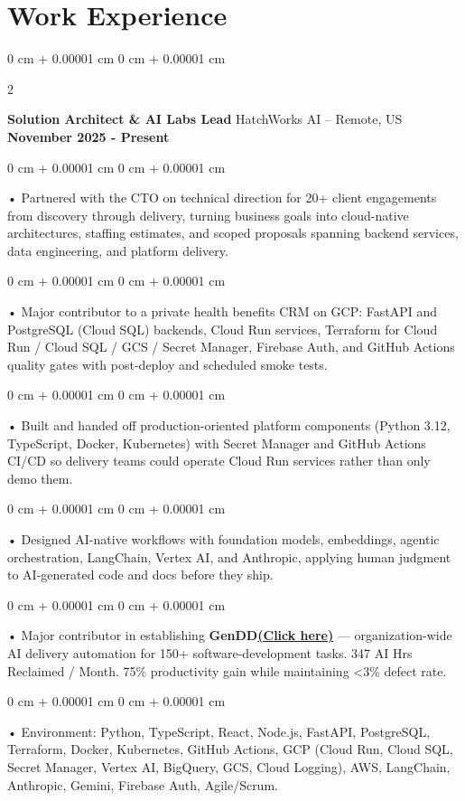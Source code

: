 \documentclass[10pt, letterpaper]{article}
\newenvironment{onecolentry}{
    \begin{adjustwidth}{
        0 cm + 0.00001 cm
    }{
        0 cm + 0.00001 cm
    }
}{
    \end{adjustwidth}
} %
\newenvironment{twocolentry}[2][]{
    \onecolentry
    \def\secondColumn{#2}
    \setcolumnwidth{\fill, 4.5 cm}
    \begin{paracol}{2}
}{
    \switchcolumn \raggedleft \secondColumn
    \end{paracol}
    \endonecolentry
} %
\begin{document}
    \vspace{0.5cm}
    \section{Work Experience}
        \vspace{0.1cm}

        \begin{twocolentry}{
            \textbf{November 2025 - Present}
        }
            \textbf{Solution Architect \& AI Labs Lead} HatchWorks AI -- Remote, US\end{twocolentry}

        \begin{onecolentry}
             • Partnered with the CTO on technical direction for 20+ client engagements from discovery through delivery, turning business goals into cloud-native architectures, staffing estimates, and scoped proposals spanning backend services, data engineering, and platform delivery.
        \end{onecolentry}
        \begin{onecolentry}
             • Major contributor to a private health benefits CRM on GCP: FastAPI and PostgreSQL (Cloud SQL) backends, Cloud Run services, Terraform for Cloud Run / Cloud SQL / GCS / Secret Manager, Firebase Auth, and GitHub Actions quality gates with post-deploy and scheduled smoke tests.
        \end{onecolentry}
        \begin{onecolentry}
             • Built and handed off production-oriented platform components (Python 3.12, TypeScript, Docker, Kubernetes) with Secret Manager and GitHub Actions CI/CD so delivery teams could operate Cloud Run services rather than only demo them.
        \end{onecolentry}
        \begin{onecolentry}
             • Designed AI-native workflows with foundation models, embeddings, agentic orchestration, LangChain, Vertex AI, and Anthropic, applying human judgment to AI-generated code and docs before they ship.
        \end{onecolentry}
        \begin{onecolentry}
             • Major contributor in establishing \textbf{GenDD}\href{https://hatchworks.com/generative-driven-development/}{\textbf{(Click here)}} --- organization-wide AI delivery automation for 150+ software-development tasks. 347 AI Hrs Reclaimed / Month. 75\% productivity gain while maintaining <3\% defect rate.
        \end{onecolentry}
        \begin{onecolentry}
             • Environment: Python, TypeScript, React, Node.js, FastAPI, PostgreSQL, Terraform, Docker, Kubernetes, GitHub Actions, GCP (Cloud Run, Cloud SQL, Secret Manager, Vertex AI, BigQuery, GCS, Cloud Logging), AWS, LangChain, Anthropic, Gemini, Firebase Auth, Agile/Scrum.
        \end{onecolentry}
\end{document}
